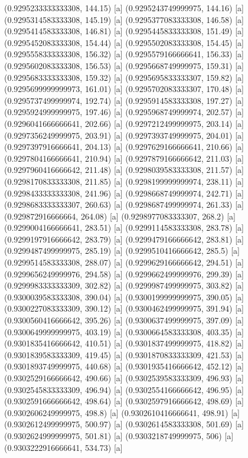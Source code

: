 {{{(0.9295233333333308, 144.15) [a] 
(0.9295243749999975, 144.16) [a] 
(0.9295314583333308, 145.19) [a] 
(0.9295377083333308, 146.58) [a] 
(0.9295414583333308, 146.81) [a] 
(0.9295445833333308, 151.49) [a] 
(0.9295452083333308, 154.44) [a] 
(0.9295502083333308, 154.45) [a] 
(0.9295558333333308, 156.32) [a] 
(0.9295579166666641, 156.33) [a] 
(0.9295602083333308, 156.53) [a] 
(0.9295668749999975, 159.31) [a] 
(0.9295683333333308, 159.32) [a] 
(0.9295695833333307, 159.82) [a] 
(0.9295699999999973, 161.01) [a] 
(0.9295702083333307, 170.48) [a] 
(0.9295737499999974, 192.74) [a] 
(0.9295914583333308, 197.27) [a] 
(0.9295924999999975, 197.46) [a] 
(0.9295968749999974, 202.57) [a] 
(0.9296041666666641, 202.66) [a] 
(0.9297212499999975, 203.14) [a] 
(0.9297356249999975, 203.91) [a] 
(0.9297393749999975, 204.01) [a] 
(0.9297397916666641, 204.13) [a] 
(0.9297629166666641, 210.66) [a] 
(0.9297804166666641, 210.94) [a] 
(0.9297879166666642, 211.03) [a] 
(0.9297960416666642, 211.48) [a] 
(0.9298039583333308, 211.57) [a] 
(0.9298170833333308, 211.85) [a] 
(0.9298199999999974, 238.11) [a] 
(0.9298433333333308, 241.96) [a] 
(0.9298668749999974, 242.71) [a] 
(0.9298683333333307, 260.63) [a] 
(0.9298687499999974, 261.33) [a] 
(0.929872916666664, 264.08) [a] 
(0.9298977083333307, 268.2) [a] 
(0.9299004166666641, 283.51) [a] 
(0.9299114583333308, 283.78) [a] 
(0.9299197916666642, 283.79) [a] 
(0.9299479166666642, 283.81) [a] 
(0.9299487499999975, 285.19) [a] 
(0.9299510416666642, 285.5) [a] 
(0.9299514583333308, 288.07) [a] 
(0.9299629166666642, 294.51) [a] 
(0.9299656249999976, 294.58) [a] 
(0.9299662499999976, 299.39) [a] 
(0.9299983333333309, 302.82) [a] 
(0.9299987499999975, 303.82) [a] 
(0.9300039583333308, 390.04) [a] 
(0.9300199999999975, 390.05) [a] 
(0.9300227083333309, 390.12) [a] 
(0.9300462499999975, 391.94) [a] 
(0.9300560416666642, 395.26) [a] 
(0.9300637499999975, 397.09) [a] 
(0.9300649999999975, 403.19) [a] 
(0.9300664583333308, 403.35) [a] 
(0.9301835416666642, 410.51) [a] 
(0.9301837499999975, 418.82) [a] 
(0.9301839583333309, 419.45) [a] 
(0.9301870833333309, 421.53) [a] 
(0.9301893749999975, 440.68) [a] 
(0.9301935416666642, 452.12) [a] 
(0.9302529166666642, 490.66) [a] 
(0.9302539583333309, 496.93) [a] 
(0.9302545833333309, 496.94) [a] 
(0.9302554166666642, 496.95) [a] 
(0.9302591666666642, 498.64) [a] 
(0.9302597916666642, 498.69) [a] 
(0.9302606249999975, 498.8) [a] 
(0.9302610416666641, 498.91) [a] 
(0.9302612499999975, 500.97) [a] 
(0.9302614583333308, 501.69) [a] 
(0.9302624999999975, 501.81) [a] 
(0.9303218749999975, 506) [a] 
(0.9303222916666641, 534.73) [a] 
}}}
